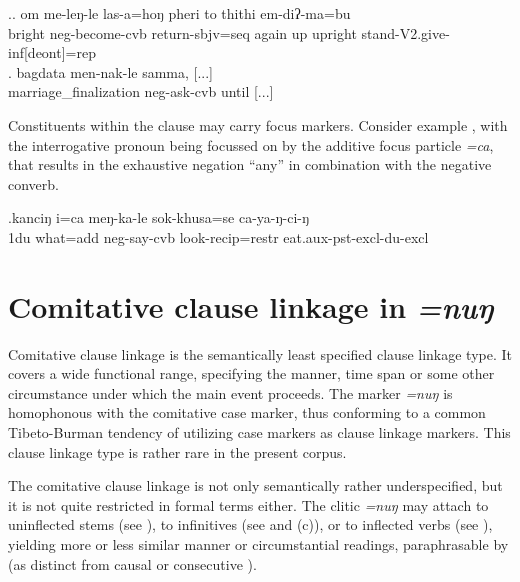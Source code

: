 \ex.\ag. om   me-leŋ-le  las-a=hoŋ  pheri to  thithi    em-diʔ-ma=bu\\
bright {\sc neg}-become-{\sc cvb} return{\sc [3sg]-sbjv=seq} again up upright stand{\sc -V2.give-inf[deont]=rep}\\
 
\bg. bagdata  men-nak-le    samma, [...]\\
marriage\_finalization {\sc neg}-ask-{\sc cvb}  until [...]\\
 


Constituents within the clause may carry focus markers. Consider example \Next, with the interrogative pronoun being focussed on by the additive focus particle \emph{=ca}, that results in the exhaustive negation “any” in combination with the negative converb. 

\exg.kanciŋ i=ca meŋ-ka-le sok-khusa=se ca-ya-ŋ-ci-ŋ\\
{\sc 1du} what{\sc =add} {\sc neg}-say-{\sc cvb} look{\sc -recip=restr} eat.{\sc aux-pst-excl-du-excl}\\
 


\section{Comitative clause linkage in \emph{=nuŋ}}\label{com-cl}

Comitative clause linkage is the semantically least specified  clause linkage type. It covers a wide functional range, specifying the  manner, time span  or some other circumstance under which the main event proceeds. The marker \emph{=nuŋ} is homophonous with the comitative case marker, thus conforming to a common Tibeto-Burman tendency of utilizing case markers as clause linkage markers. This clause linkage type is rather rare in the present corpus.

The comitative clause linkage is not only semantically rather underspecified, but it is not quite restricted in formal terms either. The clitic \emph{=nuŋ} may attach to uninflected stems (see \Next[a]), to infinitives (see \Next[b] and (c)), or to inflected verbs (see \Next[d]), yielding more or less similar manner or circumstantial readings, paraphrasable by  (as distinct from causal or consecutive ). 

